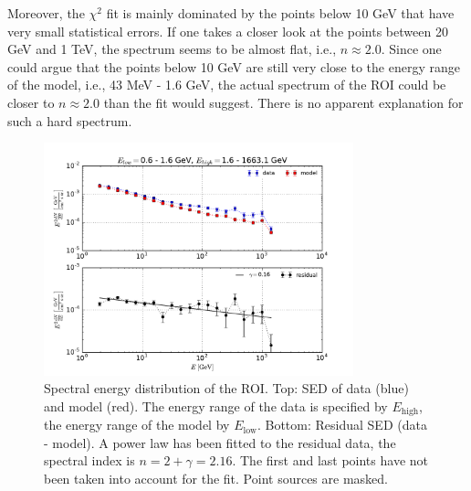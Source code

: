 \documentclass[a4paper]{article}
\begin{document}
Moreover, the $\chi^2$ fit is mainly dominated by the points below 10 GeV that have very small statistical errors. If one takes a closer look at the points between 20 GeV and 1 TeV, the spectrum seems to be almost flat, i.e., $n \approx 2.0$. Since one could argue that the points below 10 GeV are still very close to the energy range of the model, i.e., 43 MeV - 1.6 GeV, the actual spectrum of the ROI could be closer to $n \approx 2.0$ than the fit would suggest. There is no apparent explanation for such a hard spectrum.\\
\begin{figure}[t]
	\centering
	\includegraphics[width=0.8\textwidth]{Res_SED_b=(-2,2)_l=(-10,-4).pdf}
    \caption{Spectral energy distribution of the ROI. Top: SED of data (blue) and model (red). The energy range of the data is specified by $E_\text{high}$, the energy range of the model by $E_\text{low}$. Bottom: Residual SED (data - model). A power law has been fitted to the residual data, the spectral index is $n = 2 + \gamma = 2.16$. The first and last points have not been taken into account for the fit. Point sources are masked.}
    \label{res_SED}
\end{figure}
 
 
 

 
\end{document}
